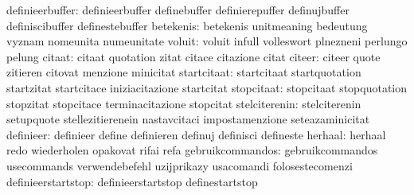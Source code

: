                  definieerbuffer: definieerbuffer                  definebuffer
                                  definierepuffer                  definujbuffer
                                  definiscibuffer                  definestebuffer
                       betekenis: betekenis                        unitmeaning
                                  bedeutung                        vyznam
                                  nomeunita                        numeunitate %
                          voluit: voluit                           infull
                                  volleswort                       plnezneni
                                  perlungo                         pelung
                          citaat: citaat                           quotation
                                  zitat                            citace
                                  citazione                        citat
                          citeer: citeer                           quote
                                  zitieren                         citovat
                                  menzione                         minicitat
                     startcitaat: startcitaat                      startquotation
                                  startzitat                       startcitace
                                  iniziacitazione                  startcitat
                      stopcitaat: stopcitaat                       stopquotation
                                  stopzitat                        stopcitace
                                  terminacitazione                 stopcitat
                   stelciterenin: stelciterenin                    setupquote
                                  stellezitierenein                nastavcitaci
                                  impostamenzione                  seteazaminicitat
                       definieer: definieer                        define
                                  definieren                       definuj
                                  definisci                        defineste
                         herhaal: herhaal                          redo
                                  wiederholen                      opakovat
                                  rifai                            refa
                gebruikcommandos: gebruikcommandos                 usecommands
                                  verwendebefehl                   uzijprikazy
                                  usacomandi                       folosestecomenzi
              definieerstartstop: definieerstartstop               definestartstop
